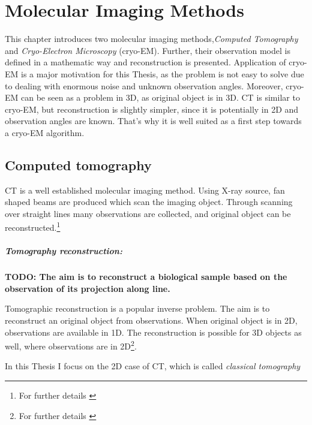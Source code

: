 \chapter{Molecular Imaging Methods}
\label{sec:imaging}

This chapter introduces two molecular imaging methods,\textit{Computed Tomography} and 
\textit{Cryo-Electron Microscopy} (cryo-EM). 
Further, their observation model is defined in a mathematic way and reconstruction is presented.
Application of cryo-EM is a major motivation for this Thesis, 
as the problem is not easy to solve due to dealing with enormous noise and unknown observation angles.
Moreover, cryo-EM can be seen as a problem in 3D, as original object is in 3D.
CT is similar to cryo-EM, but reconstruction is slightly simpler, since it is potentially in 2D and 
observation angles are known.
That's why it is well suited as a first step towards a cryo-EM algorithm.



\section{Computed tomography}
CT is a well established molecular imaging method.
Using X-ray source, fan shaped beams are produced which scan the imaging object.
Through scanning over straight lines many observations are collected, 
and original object can be reconstructed.\footnote{For further details \cite{computedTomography}}

\paragraph{Tomography reconstruction:}
\textbf{TODO: The aim is to reconstruct a biological sample based on the observation of its projection along  line.}

Tomographic reconstruction is a popular inverse problem. 
The aim is to reconstruct an original object from observations.
When original object is in 2D, observations are available in 1D. 
The reconstruction is possible for 3D objects as well, where observations are in 2D\footnote{For further details \cite{tomographicReconstruction}}.


\begin{tcolorbox}[colback=red!5!white,colframe=red!75!black]
    In this Thesis I focus on the 2D case of CT, which is called \textit{classical tomography }
\end{tcolorbox}

\pagebreak

